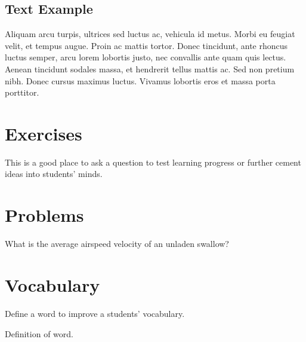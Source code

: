 \documentclass[
	11pt, %
	fleqn, %
	a4paper, %
]{LegrandOrangeBook}
\begin{document}
\subsection{Text Example}

\begin{example}[Example name] %
	Aliquam arcu turpis, ultrices sed luctus ac, vehicula id metus. Morbi eu feugiat velit, et tempus augue. Proin ac mattis tortor. Donec tincidunt, ante rhoncus luctus semper, arcu lorem lobortis justo, nec convallis ante quam quis lectus. Aenean tincidunt sodales massa, et hendrerit tellus mattis ac. Sed non pretium nibh. Donec cursus maximus luctus. Vivamus lobortis eros et massa porta porttitor.
\end{example}


\section{Exercises}

\begin{exercise} %
	This is a good place to ask a question to test learning progress or further cement ideas into students' minds.
\end{exercise}


\section{Problems}

\begin{problem} %
What is the average airspeed velocity of an unladen swallow?
\end{problem}


\section{Vocabulary}

Define a word to improve a students' vocabulary.

\begin{vocabulary}[Word] %
	Definition of word.
\end{vocabulary}
\end{document}

